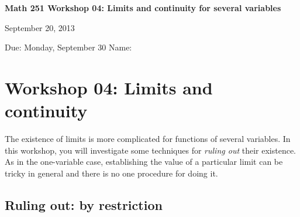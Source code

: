 \documentclass[12pt]{exam}
\theoremstyle{definition}
\begin{document}
\lstset{language=R}
\noindent
\textbf{{\large Math 251 \hfill Workshop 04: Limits and continuity for several variables}}

\noindent
September 20, 2013 

\noindent
Due: Monday, September 30 \hfill Name: \underline{\hspace{3in}} 

\noindent

\newtheorem{fact}{Fact}

\section{Workshop 04: Limits and continuity}

The existence of limits is more complicated for functions of several
variables. In this workshop, you will investigate some techniques for
\emph{ruling out} their existence. As in the one-variable case,
establishing the value of a particular limit can be tricky in general
and there is no one procedure for doing it.

\subsection{Ruling out: by restriction}
\end{document}
